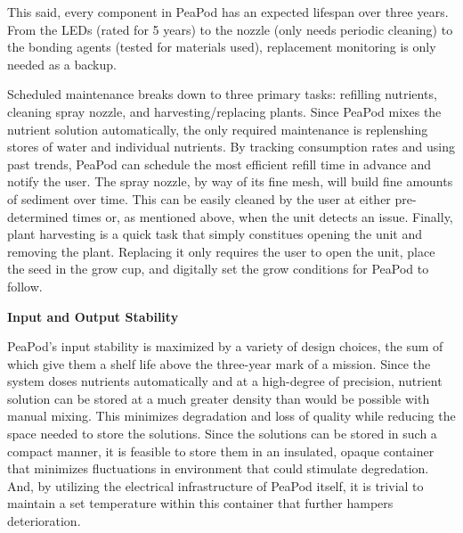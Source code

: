 \documentclass{report}
\begin{document}
This said, every component in PeaPod has an expected lifespan over three years. From the LEDs (rated for 5 years) to the nozzle (only needs periodic cleaning) to the bonding agents (tested for materials used), replacement monitoring is only needed as a backup.

Scheduled maintenance breaks down to three primary tasks: refilling nutrients, cleaning spray nozzle, and harvesting/replacing plants.
Since PeaPod mixes the nutrient solution automatically, the only required maintenance is replenshing stores of water and individual nutrients. By tracking consumption rates and using past trends, PeaPod can schedule the most efficient refill time in advance and notify the user.
The spray nozzle, by way of its fine mesh, will build fine amounts of sediment over time. This can be easily cleaned by the user at either pre-determined times or, as mentioned above, when the unit detects an issue.
Finally, plant harvesting is a quick task that simply constitues opening the unit and removing the plant. Replacing it only requires the user to open the unit, place the seed in the grow cup, and digitally set the grow conditions for PeaPod to follow.

\textbf{Input and Output Stability}






PeaPod's input stability is maximized by a variety of design choices, the sum of which give them a shelf life above the three-year mark of a mission. Since the system doses nutrients automatically and at a high-degree of precision, nutrient solution can be stored at a much greater density than would be possible with manual mixing. This minimizes degradation and loss of quality while reducing the space needed to store the solutions. Since the solutions can be stored in such a compact manner, it is feasible to store them in an insulated, opaque container that minimizes fluctuations in environment that could stimulate degredation. And, by utilizing the electrical infrastructure of PeaPod itself, it is trivial to maintain a set temperature within this container that further hampers deterioration.
\end{document}
